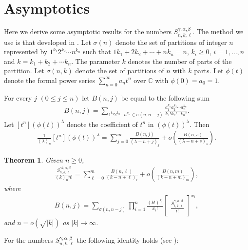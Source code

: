 \documentclass[12pt, reqno]{amsart}
\newtheorem{proof 1}{proof 1}
\newtheorem{theorem}{Theorem}[section]
\begin{document}
\section{Asymptotics}
Here we derive some asymptotic results for the numbers $S^{\gamma,\alpha,\beta}_{n,k,\ell}$. The method we use is that developed in \cite{hsu1990power,hsu1991kind, nkonkobe2020combinatorial}. Let $\sigma(n)$ denote the set of partitions of integer $n$ represented by $1^{k_1}2^{k_2}\cdots n^{k_n}$ such that 
$1k_1+2k_2+\cdots+ nk_n=n$, $k_i\geq 0$, $i=1,\ldots, n$ and $k=k_1+k_2+\cdots k_n$.
The parameter $k$ denotes the number of parts of the partition. Let $\sigma(n,k)$ denote the set of partitions of $n$ with $k$ parts.  Let  $\phi(t)$ denote the formal power series $\sum_{n=0}^\infty a_nt^n$ over $\mathbb{C}$ with $\phi(0)=a_0=1$.

For every $j$ $(0\leq j\leq n)$ let $B(n,j)$ be equal to the following sum
\begin{align*}
B(n,j) = \sum_{1^{k_1}2^{k_2}\cdots n^{k_n}\in \sigma(n,n-j)}\frac{a_1^{k_1}a_2^{k_2}\cdots a_n^{k_n}}{k_1!k_2!\cdots k_n!}.
\end{align*}
Let $[t^n](\phi(t))^{\lambda}$ denote the coefficient of $t^n$ in $(\phi(t))^{\lambda}$. Then 
\begin{align*}
\frac{1}{(\lambda)_n}[t^n](\phi(t))^{\lambda}  = \sum_{j=0}^{m} \frac{B(n,j)}{(\lambda-n+j)_{j}}+ o\left(\frac{B(n,s)}{(\lambda-n+s)_{s}}\right).
\end{align*}

\begin{theorem}\label{theorem:200} Given $n\geq0$,	
	\begin{align*}
		\frac{S^{{\gamma k},\alpha,\beta}_{n,k,\ell}}{(k)_nn!}=\sum\limits_{\ell=0}^m\frac{B(n,\ell)}{(k-n+\ell)_{\ell}}+o\left(
			\frac{B(n,m)}{(k-n+m)_m}
		\right),
	\end{align*}
	where \begin{align*}B(n,j)=\sum\limits_{\sigma(n,n-j)}\prod\limits_{i=1}^n\frac{(k!)^{x_i}}{x_i!}\begin{bmatrix}
			\frac{S^{\gamma,\alpha,\beta}_{i,k,\ell}}{i!}
		\end{bmatrix}^{x_i},\end{align*} and $n=o(\sqrt{|k|})$ as  $|k|\rightarrow \infty$.	
\end{theorem}



For the numbers $S^{{\gamma},\alpha,\beta}_{n,k,\ell}$ the following identity holds (see \cite{hsu1990power}):
\end{document}

